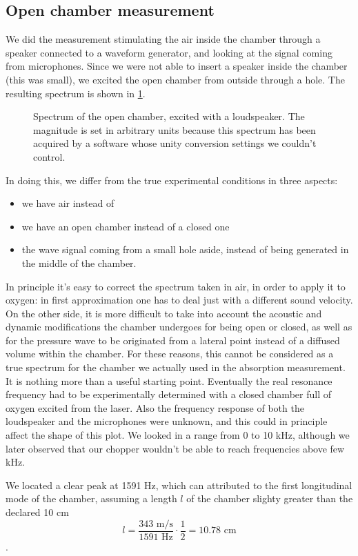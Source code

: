 	\subsection{Open chamber measurement}
We did the measurement stimulating the air inside the chamber through a speaker connected to a waveform generator, and looking at the signal coming from microphones. Since we were not able to insert a speaker inside the chamber (this was small), we excited the open chamber from outside through a hole. The resulting spectrum is shown in \cref{chamberplot}.
\begin{figure}[!bht]\centering

\caption{Spectrum of the open chamber, excited with a loudspeaker. The magnitude is set in arbitrary units because this spectrum has been acquired by a software whose unity conversion settings we couldn't control.}
\label{chamberplot}
\end{figure}
In doing this, we differ from the true experimental conditions in three aspects:
\begin{itemize}
\item we have air instead of 
\item we have an open chamber instead of a closed one 
\item the wave signal coming from a small hole aside, instead of being generated in the middle of the chamber.
\end{itemize}

In principle it's easy to correct the spectrum taken in air, in order to apply it to oxygen: in first approximation one has to deal just with a different sound velocity. On the other side, it is more difficult to take into account the acoustic and dynamic modifications the chamber undergoes for being open or closed, as well as for the pressure wave to be originated from a lateral point instead of a diffused volume within the chamber. For these reasons, this cannot be considered as a true spectrum for the chamber we actually used in the absorption measurement. It is nothing more than a useful starting point. Eventually the real resonance frequency had to be experimentally determined with a closed chamber full of oxygen excited from the laser. Also the frequency response of both the loudspeaker and the microphones were unknown, and this could in principle affect the shape of this plot. We looked in a range from 0 to 10 kHz, although we later observed that our chopper wouldn't be able to reach frequencies above few kHz.

We located a clear peak at 1591 Hz, which can attributed to the first longitudinal mode of the chamber, assuming a length $l$ of the chamber slighty greater than the declared 10 cm$$l=\frac{343\mbox{ m/s}}{1591\mbox{ Hz}}\cdot\frac{1}{2}=10.78\mbox{ cm}$$.

